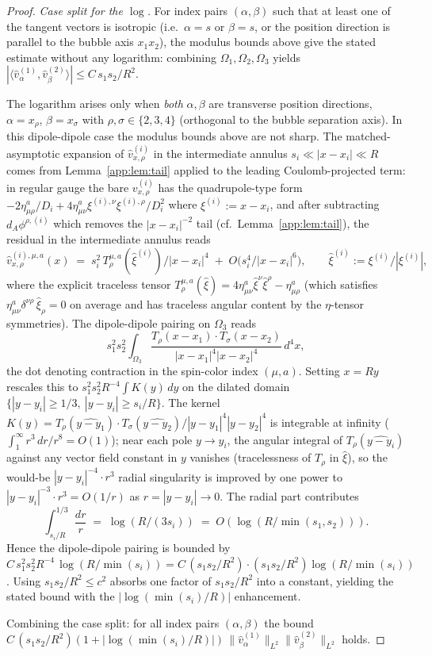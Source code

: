 \documentclass[11pt,letterpaper]{article}
\theoremstyle{definition}
\begin{document}
\begin{proof}
\medskip
\emph{Case split for the $\log$.}
For index pairs $(\alpha,\beta)$ such that at least one of the tangent vectors is isotropic (i.e.\ $\alpha=s$ or $\beta=s$, or the position direction is parallel to the bubble axis $x_1x_2$), the modulus bounds above give the stated estimate without any logarithm: combining $\Omega_1, \Omega_2, \Omega_3$ yields $|\langle\hat v_\alpha^{(1)},\hat v_\beta^{(2)}\rangle| \le C\,s_1 s_2/R^2$.

The logarithm arises only when \emph{both} $\alpha, \beta$ are transverse position directions, $\alpha = x_\rho$, $\beta = x_\sigma$ with $\rho,\sigma\in\{2,3,4\}$ (orthogonal to the bubble separation axis). In this dipole-dipole case the modulus bounds above are not sharp. The matched-asymptotic expansion of $\hat v_{x,\rho}^{(i)}$ in the intermediate annulus $s_i\ll |x-x_i|\ll R$ comes from Lemma~\ref{app:lem:tail} applied to the leading Coulomb-projected term: in regular gauge the bare $v_{x,\rho}^{(i)}$ has the quadrupole-type form $-2\eta^a_{\mu\rho}/D_i + 4\eta^a_{\mu\nu}\xi^{(i),\nu}\xi^{(i),\rho}/D_i^2$ where $\xi^{(i)} := x - x_i$, and after subtracting $d_A\phi^{\rho,(i)}$ which removes the $|x-x_i|^{-2}$ tail (cf.\ Lemma~\ref{app:lem:tail}), the residual in the intermediate annulus reads
\[
\hat v_{x,\rho}^{(i),\mu,a}(x) \;=\; s_i^2\,T^{\mu,a}_\rho(\hat\xi^{(i)})/|x-x_i|^4 \;+\; O\bigl(s_i^4/|x-x_i|^6\bigr),
\qquad \hat\xi^{(i)} := \xi^{(i)}/|\xi^{(i)}|,
\]
where the explicit traceless tensor $T_\rho^{\mu,a}(\hat\xi) = 4\eta^a_{\mu\nu}\hat\xi^\nu \hat\xi^\rho - \eta^a_{\mu\rho}$ (which satisfies $\eta^a_{\mu\nu}\delta^{\nu\rho}\,\hat\xi_\rho = 0$ on average and has traceless angular content by the $\eta$-tensor symmetries). The dipole-dipole pairing on $\Omega_3$ reads
\[
s_1^2 s_2^2 \int_{\Omega_3}\frac{T_\rho(x-x_1)\cdot T_\sigma(x-x_2)}{|x-x_1|^4|x-x_2|^4}\,d^4x,
\]
the dot denoting contraction in the spin-color index $(\mu, a)$. Setting $x = Ry$ rescales this to $s_1^2 s_2^2 R^{-4}\int K(y)\,dy$ on the dilated domain $\{|y-y_i|\ge 1/3,\ |y-y_i|\ge s_i/R\}$. The kernel $K(y) = T_\rho(\hat{y-y_1})\cdot T_\sigma(\hat{y-y_2})/|y-y_1|^4|y-y_2|^4$ is integrable at infinity ($\int_1^\infty r^3\,dr/r^8 = O(1)$); near each pole $y \to y_i$, the angular integral of $T_\rho(\hat{y-y_i})$ against any vector field constant in $y$ vanishes (tracelessness of $T_\rho$ in $\hat\xi$), so the would-be $|y-y_i|^{-4}\cdot r^3$ radial singularity is improved by one power to $|y-y_i|^{-3}\cdot r^3 = O(1/r)$ as $r = |y-y_i|\to 0$. The radial part contributes
\[
\int_{s_i/R}^{1/3} \frac{dr}{r} \;=\; \log(R/(3s_i)) \;=\; O(\log(R/\min(s_1,s_2))).
\]
Hence the dipole-dipole pairing is bounded by $C\,s_1^2 s_2^2 R^{-4}\,\log(R/\min(s_i)) = C\,(s_1 s_2/R^2)\cdot(s_1 s_2/R^2)\log(R/\min(s_i))$. Using $s_1 s_2/R^2 \le c^2$ absorbs one factor of $s_1 s_2/R^2$ into a constant, yielding the stated bound with the $|\log(\min(s_i)/R)|$ enhancement.

Combining the case split: for all index pairs $(\alpha,\beta)$ the bound $C\,(s_1 s_2/R^2)(1+|\log(\min(s_i)/R)|)\,\|\hat v_\alpha^{(1)}\|_{L^2}\|\hat v_\beta^{(2)}\|_{L^2}$ holds.
\end{proof}
\end{document}
